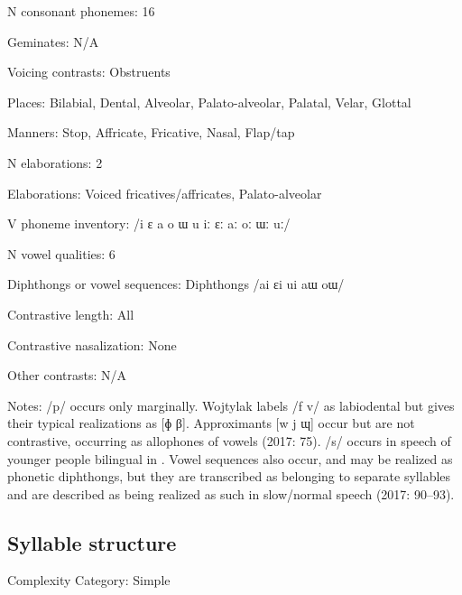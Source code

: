 {\begin{appendixdesc}
\item[N consonant phonemes:] 16

\item[Geminates:] N/A

\item[Voicing contrasts:] Obstruents

\item[Places:] Bilabial, Dental, Alveolar, Palato-alveolar, Palatal, Velar, Glottal

\item[Manners:] Stop, Affricate, Fricative, Nasal, Flap/tap

\item[N elaborations:] 2

\item[Elaborations:] Voiced fricatives/affricates, Palato-alveolar

\item[V phoneme inventory:] /i ɛ a o ɯ u iː ɛː aː oː ɯː uː/

\item[N vowel qualities:] 6

\item[Diphthongs or vowel sequences:] Diphthongs /ai ɛi ui aɯ oɯ/

\item[Contrastive length:] All

\item[Contrastive nasalization:] None

\item[Other contrasts:] N/A

\item[Notes:] /p/ occurs only marginally. Wojtylak labels /f v/ as labiodental but gives their typical realizations as [ɸ β]. Approximants [w j ɰ] occur but are not contrastive, occurring as allophones of vowels (2017: 75). /s/ occurs in speech of younger people bilingual in . Vowel sequences also occur, and may be realized as phonetic diphthongs, but they are transcribed as belonging to separate syllables and are described as being realized as such in slow/normal speech (2017: 90--93).
\end{appendixdesc}
\subsection*{Syllable structure}
\begin{appendixdesc}

\item[Complexity Category:] Simple


\end{appendixdesc}}
